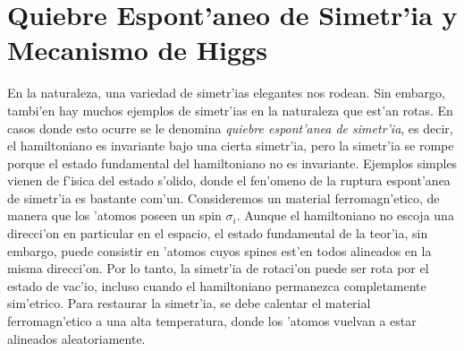 \chapter{Quiebre Espont'aneo de Simetr'ia y Mecanismo de Higgs}

En la naturaleza, una variedad de simetr'ias  elegantes  nos rodean. Sin embargo, tambi'en hay muchos ejemplos de simetr'ias en la naturaleza que est'an rotas. 
En casos donde esto ocurre se le denomina  \textit{quiebre espont'anea de simetr'ia}, es decir, el hamiltoniano es invariante bajo una cierta simetr'ia, pero la simetr'ia se rompe porque el estado fundamental del hamiltoniano no es invariante.  
Ejemplos  simples vienen de f'isica del estado s'olido, donde el fen'omeno de la ruptura espont'anea de  simetr'ia es bastante com'un. Consideremos un material ferromagn'etico, de manera que los 'atomos poseen un spin $\sigma_i$. Aunque el hamiltoniano no escoja una  direcci'on en  particular en el espacio, el estado fundamental de la teor'ia, sin embargo, puede consistir en 'atomos cuyos spines est'en todos alineados en la misma direcci'on. Por lo tanto, la simetr'ia de rotaci'on puede ser rota por el estado de vac'io, incluso cuando el hamiltoniano permanezca completamente sim'etrico. Para restaurar la simetr'ia, se debe calentar el material ferromagn'etico a una alta temperatura, donde los 'atomos vuelvan a estar alineados aleatoriamente.

